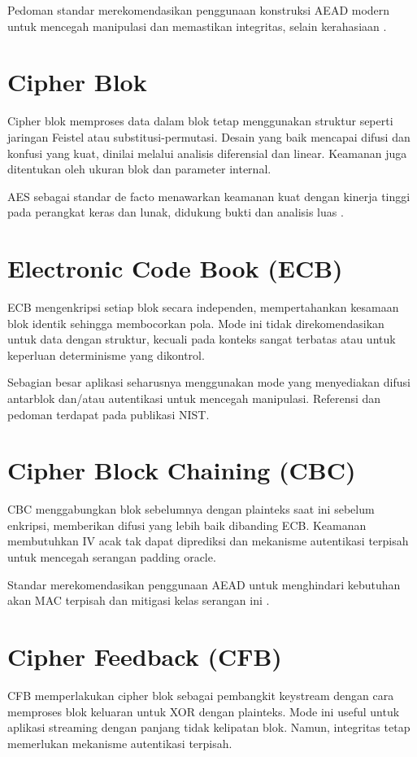 \documentclass[../main.tex]{subfiles}
\begin{document}
Pedoman standar merekomendasikan penggunaan konstruksi AEAD modern untuk mencegah manipulasi dan memastikan integritas, selain kerahasiaan \parencite{rfc5116}.

\section{Cipher Blok}
Cipher blok memproses data dalam blok tetap menggunakan struktur seperti jaringan Feistel atau substitusi-permutasi. Desain yang baik mencapai difusi dan konfusi yang kuat, dinilai melalui analisis diferensial dan linear. Keamanan juga ditentukan oleh ukuran blok dan parameter internal.

AES sebagai standar de facto menawarkan keamanan kuat dengan kinerja tinggi pada perangkat keras dan lunak, didukung bukti dan analisis luas \parencite{fips197}.

\section{Electronic Code Book (ECB)}
ECB mengenkripsi setiap blok secara independen, mempertahankan kesamaan blok identik sehingga membocorkan pola. Mode ini tidak direkomendasikan untuk data dengan struktur, kecuali pada konteks sangat terbatas atau untuk keperluan determinisme yang dikontrol.

Sebagian besar aplikasi seharusnya menggunakan mode yang menyediakan difusi antarblok dan/atau autentikasi untuk mencegah manipulasi. Referensi dan pedoman terdapat pada publikasi NIST.

\section{Cipher Block Chaining (CBC)}
CBC menggabungkan blok sebelumnya dengan plainteks saat ini sebelum enkripsi, memberikan difusi yang lebih baik dibanding ECB. Keamanan membutuhkan IV acak tak dapat diprediksi dan mekanisme autentikasi terpisah untuk mencegah serangan padding oracle.

Standar merekomendasikan penggunaan AEAD untuk menghindari kebutuhan akan MAC terpisah dan mitigasi kelas serangan ini \parencite{nist80038d}.

\section{Cipher Feedback (CFB)}
CFB memperlakukan cipher blok sebagai pembangkit keystream dengan cara memproses blok keluaran untuk XOR dengan plainteks. Mode ini useful untuk aplikasi streaming dengan panjang tidak kelipatan blok. Namun, integritas tetap memerlukan mekanisme autentikasi terpisah.
\end{document}
